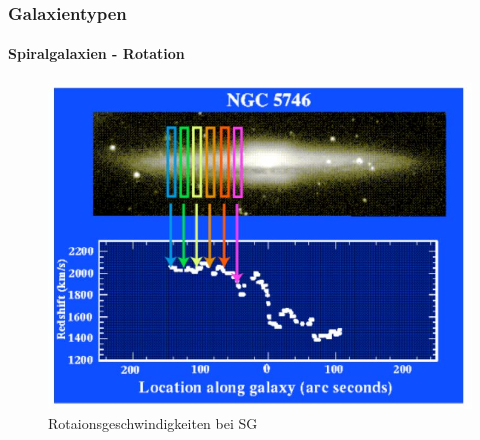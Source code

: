 \begin{frame}
\frametitle{Galaxientypen}
\framesubtitle{Spiralgalaxien - Rotation}

\begin{figure}[h]
	\includegraphics[scale=0.4]{Spiralgalaxie_Rotation1.jpg}
	\caption{Rotaionsgeschwindigkeiten bei SG}
\end{figure}

\end{frame}




